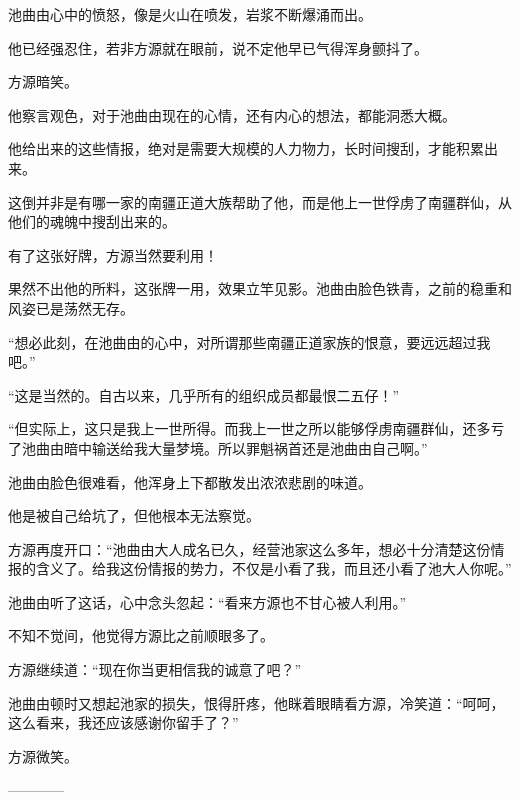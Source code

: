 \begin{this_body}
池曲由心中的愤怒，像是火山在喷发，岩浆不断爆涌而出。

他已经强忍住，若非方源就在眼前，说不定他早已气得浑身颤抖了。

方源暗笑。

他察言观色，对于池曲由现在的心情，还有内心的想法，都能洞悉大概。

他给出来的这些情报，绝对是需要大规模的人力物力，长时间搜刮，才能积累出来。

这倒并非是有哪一家的南疆正道大族帮助了他，而是他上一世俘虏了南疆群仙，从他们的魂魄中搜刮出来的。

有了这张好牌，方源当然要利用！

果然不出他的所料，这张牌一用，效果立竿见影。池曲由脸色铁青，之前的稳重和风姿已是荡然无存。

“想必此刻，在池曲由的心中，对所谓那些南疆正道家族的恨意，要远远超过我吧。”

“这是当然的。自古以来，几乎所有的组织成员都最恨二五仔！”

“但实际上，这只是我上一世所得。而我上一世之所以能够俘虏南疆群仙，还多亏了池曲由暗中输送给我大量梦境。所以罪魁祸首还是池曲由自己啊。”

池曲由脸色很难看，他浑身上下都散发出浓浓悲剧的味道。

他是被自己给坑了，但他根本无法察觉。

方源再度开口：“池曲由大人成名已久，经营池家这么多年，想必十分清楚这份情报的含义了。给我这份情报的势力，不仅是小看了我，而且还小看了池大人你呢。”

池曲由听了这话，心中念头忽起：“看来方源也不甘心被人利用。”

不知不觉间，他觉得方源比之前顺眼多了。

方源继续道：“现在你当更相信我的诚意了吧？”

池曲由顿时又想起池家的损失，恨得肝疼，他眯着眼睛看方源，冷笑道：“呵呵，这么看来，我还应该感谢你留手了？”

方源微笑。

------------

\end{this_body}

